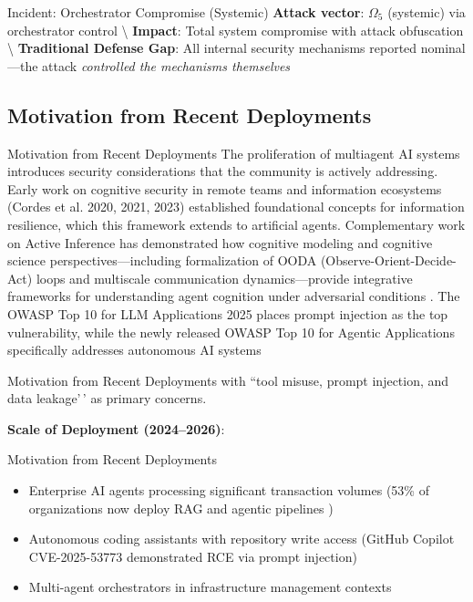 \documentclass[
  ignorenonframetext,
]{beamer}
\begin{document}
\begin{frame}[allowframebreaks]{Incident: Orchestrator Compromise
(Systemic)}
\textbf{Attack vector}: \(\Omega_5\) (systemic) via orchestrator control
\textbackslash{} \textbf{Impact}: Total system compromise with attack
obfuscation \textbackslash{} \textbf{Traditional Defense Gap}: All
internal security mechanisms reported nominal---the attack
\textit{controlled the mechanisms themselves}
\end{frame}

\subsection{Motivation from Recent Deployments}\label{sec:motivation}

\begin{frame}[allowframebreaks]{Motivation from Recent Deployments}
The proliferation of multiagent AI systems introduces security
considerations that the community is actively addressing. Early work on
cognitive security in remote teams and information ecosystems ({Cordes
et al.} 2020, 2021, 2023) established foundational concepts for
information resilience, which this framework extends to artificial
agents. Complementary work on Active Inference has demonstrated how
cognitive modeling and cognitive science perspectives---including
formalization of OODA (Observe-Orient-Decide-Act) loops and multiscale
communication dynamics---provide integrative frameworks for
understanding agent cognition under adversarial conditions
\cite{david2021aic}. The OWASP Top 10 for LLM Applications 2025
\cite{owasp2025llm} places prompt injection as the top vulnerability,
while the newly released OWASP Top 10 for Agentic Applications
\cite{owasp2025agentic} specifically addresses autonomous AI systems
\end{frame}

\begin{frame}[allowframebreaks]{Motivation from Recent Deployments}
with ``tool misuse, prompt injection, and data leakage'\,' as primary
concerns.

\textbf{Scale of Deployment (2024--2026)}:

\end{frame}

\begin{frame}[allowframebreaks]{Motivation from Recent Deployments}
\begin{itemize}
\item Enterprise AI agents processing significant transaction volumes (53\% of organizations now deploy RAG and agentic pipelines \cite{owasp2025llm})
\item Autonomous coding assistants with repository write access (GitHub Copilot CVE-2025-53773 demonstrated RCE via prompt injection)
\item Multi-agent orchestrators in infrastructure management contexts
\end{itemize}

\end{frame}
\end{document}
